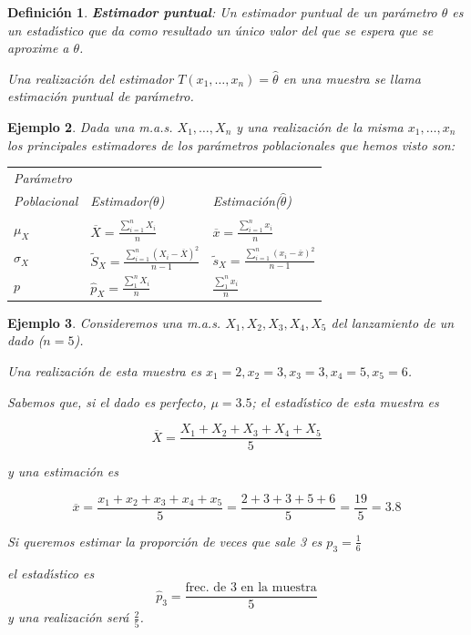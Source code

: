 \documentclass[12pt]{report}
\newtheorem{definition}{Definici\'on}
\newtheorem{example}[definition]{Ejemplo}
\begin{document}
  \begin{definition}\textbf{Estimador puntual}:
 Un \emph{estimador puntual} de un par\'ametro $\theta$ es un estad\'{\i}stico que da
 como resultado un \'unico valor del que se espera que se aproxime a $\theta$.

 Una \emph{realizaci\'on del estimador} $T(x_{1},\ldots,x_{n})=\hat{\theta }$
 en una muestra se llama \emph{ estimaci\'on puntual de par\'ametro}.
 \end{definition}


     \begin{example}  Dada una m.a.s.
     $X_{1},\ldots,X_{n}$ y una realizaci\'on de la misma
     $x_{1},\ldots,x_{n}$ los principales estimadores de los
     par\'ametros poblacionales que hemos visto son:

     \begin{center}

     \begin{tabular}{lll}
     \hline
     Par\'ametro & & \\
    Poblacional & Estimador($\theta$) & Estimaci\'on($\hat{\theta}$)\\
    &  &  \\
     \hline
    $\mu_{X}$ & $\overline{X}=\frac{\sum_{i=1}^n X_{i}}{n}$ &  $\overline{x}=\frac{\sum_{i=1}^n x_{i}}{n}$ \\
    $\sigma_{X}$ & $\tilde{S}_{X}=\frac{\sum_{i=1}^n
    (X_{i}-\overline{X})^2}{n-1}$ &
    $\tilde{s}_{X}=\frac{\sum_{i=1}^n
    (x_{i}-\overline{x})^2}{n-1}$\\\hline
    $p$ & $\hat{p}_{X}=\frac{\sum_{1}^n X_i}{n}$ & $\frac{\sum_{1}^n x_i}{n}$ \\
    \hline
    \end{tabular}
    \end{center}
     \end{example}

     \begin{example} Consideremos una m.a.s.
     $X_{1},X_{2},X_{3},X_{4},X_{5}$ del lanzamiento de un dado ($n=5$).

     Una realizaci\'on de esta muestra es
     $x_{1}=2,x_{2}=3,x_{3}=3,x_{4}=5,x_{5}=6$.


     Sabemos que, si el dado es perfecto, $\mu=3.5$;
     el estad\'{\i}stico de esta muestra es


    $$\overline{X}=\frac{X_{1}+X_{2}+X_{3}+X_{4}+X_{5}}{5}$$

     y una estimaci\'on es

    $$\overline{x}=\frac{x_{1}+x_{2}+x_{3}+x_{4}+x_{5}}{5}=
     \frac{2+3+3+5+6}{5}=\frac{19}{5}=3.8$$

    Si queremos estimar  la proporci\'on de veces que sale 3 es $p_{3}=
     \frac{1}{6}$

     el estad\'{\i}stico es
     $$\hat{p}_{3}=\frac{\mbox{frec. de 3 en la muestra}}{5}$$
     y una realizaci\'on ser\'a $\frac{2}{5}$.

         \end{example}
\end{document}
